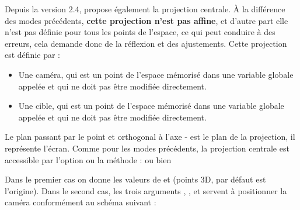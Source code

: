 Depuis la version 2.4, \luadrawenv propose également la projection centrale. À la différence des modes précédents, \textbf{cette projection n'est pas affine}, et d'autre part elle n'est pas définie pour tous les points de l'espace, ce qui peut conduire à des erreurs, cela demande donc de la réflexion et des ajustements. Cette projection est définie par :

\begin{itemize}
    \item Une caméra, qui est un point de l'espace mémorisé dans une variable globale appelée  et qui ne  doit pas être modifiée directement.
    \item Une cible, qui est un point de l'espace mémorisé dans une variable globale appelée  et qui ne  doit pas être modifiée directement.
\end{itemize}

Le plan passant par le point  et orthogonal à l'axe  -  est le plan de la projection, il représente l'écran. Comme pour les modes précédents, la projection centrale est accessible par l'option  ou la méthode  :
ou bien 

Dans le premier cas on donne les valeurs de  et  (points 3D, par défaut  est l'origine). Dans le second cas, les trois arguments , , et   servent à positionner la caméra conformément au schéma suivant :

